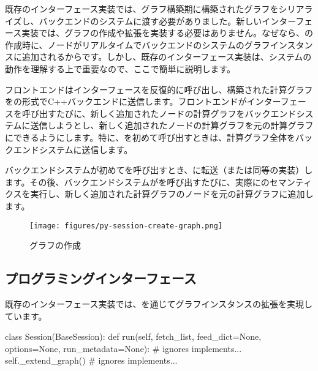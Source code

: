 \begin{content}

既存のインターフェース実装では、グラフ構築期に構築されたグラフをシリアライズし、バックエンドのシステムに渡す必要がありました。新しいインターフェース実装では、グラフの作成や拡張を実装する必要はありません。なぜなら、の作成時に、ノードがリアルタイムでバックエンドのシステムのグラフインスタンスに追加されるからです。しかし、既存のインターフェース実装は、システムの動作を理解する上で重要なので、ここで簡単に説明します。

フロントエンドはインターフェースを反復的に呼び出し、構築された計算グラフをの形式でC++バックエンドに送信します。フロントエンドがインターフェースを呼び出すたびに、新しく追加されたノードの計算グラフをバックエンドシステムに送信しようとし、新しく追加されたノードの計算グラフを元の計算グラフにできるようにします。特に、を初めて呼び出すときは、計算グラフ全体をバックエンドシステムに送信します。

バックエンドシステムが初めてを呼び出すとき、に転送（または同等の実装）します。その後、バックエンドシステムがを呼び出すたびに、実際にのセマンティクスを実行し、新しく追加された計算グラフのノードを元の計算グラフに追加します。

\begin{figure}[H]
\centering
\texttt{[image: figures/py-session-create-graph.png]}
\caption{グラフの作成}
 \label{fig:py-session-create-graph}
\end{figure}

\subsection{プログラミングインターフェース}

既存のインターフェース実装では、を通じてグラフインスタンスの拡張を実現しています。

\begin{leftbar}
\begin{python}[caption={tensorflow/python/client/session.py}]
class Session(BaseSession):
  def run(self, fetch_list, feed_dict=None, options=None, run_metadata=None):
    # ignores implements...
    self._extend_graph()
    # ignores implements...
\end{python}
\end{leftbar}


\end{content}
